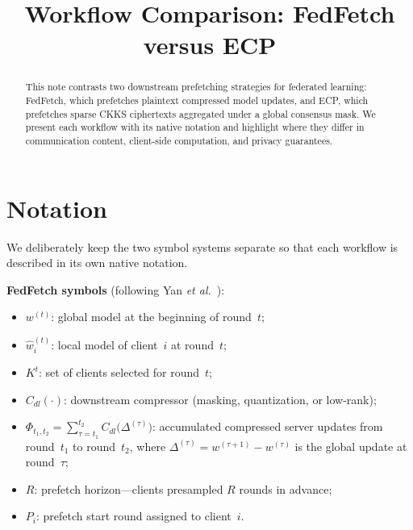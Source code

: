 \documentclass[conference]{IEEEtran}
\begin{document}
\title{Workflow Comparison: FedFetch versus ECP}
\author{}
\maketitle

\begin{abstract}
This note contrasts two downstream prefetching strategies for federated learning: FedFetch, which prefetches plaintext compressed model updates, and ECP, which prefetches sparse CKKS ciphertexts aggregated under a global consensus mask.
We present each workflow with its native notation and highlight where they differ in communication content, client-side computation, and privacy guarantees.
\end{abstract}

\section{Notation}

We deliberately keep the two symbol systems separate so that each workflow is described in its own native notation.

\textbf{FedFetch symbols} (following Yan \emph{et al.}~\cite{yan2025fedfetch}):
\begin{itemize}
    \item $w^{(t)}$: global model at the beginning of round~$t$;
    \item $\hat{w}_i^{(t)}$: local model of client~$i$ at round~$t$;
    \item $K^t$: set of clients selected for round~$t$;
    \item $C_{dl}(\cdot)$: downstream compressor (masking, quantization, or low-rank);
    \item $\Phi_{t_1,t_2}=\sum_{\tau=t_1}^{t_2} C_{dl}\bigl(\Delta^{(\tau)}\bigr)$: accumulated compressed server updates from round~$t_1$ to round~$t_2$, where $\Delta^{(\tau)}=w^{(\tau+1)}-w^{(\tau)}$ is the global update at round~$\tau$;
    \item $R$: prefetch horizon---clients presampled $R$ rounds in advance;
    \item $P_i$: prefetch start round assigned to client~$i$.
\end{itemize}
\end{document}
